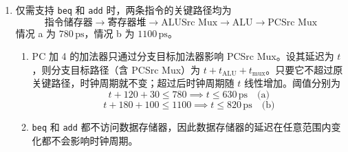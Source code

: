 \begin{problem}
\begin{solution}
\begin{enumerate}
            \item[\textbf{6)}] 仅需支持 \texttt{beq} 和 \texttt{add} 时，两条指令的关键路径均为
            $$
            \text{指令储存器} \to \text{寄存器堆} \to \text{ALUSrc Mux} \to \text{ALU} \to \text{PCSrc Mux}
            $$
            情况 a 为 $780\,\mathrm{ps}$，情况 b 为 $1100\,\mathrm{ps}$。
            \begin{enumerate}
                \item[\textbf{a)}] PC 加 4 的加法器只通过分支目标加法器影响 PCSrc Mux。设其延迟为 $t$，则分支目标路径（含 PCSrc Mux）为 $t + t_{\text{ALU}} + t_{\text{mux}}$。只要它不超过原关键路径，时钟周期就不变；超过后时钟周期随 $t$ 线性增加。阈值分别为
                $$
                t + 120 + 30 \le 780 \implies t \le 630\,\mathrm{ps}\quad\text{(a)}
                $$
                $$
                t + 180 + 100 \le 1100 \implies t \le 820\,\mathrm{ps}\quad\text{(b)}
                $$
                \item[\textbf{b)}] \texttt{beq} 和 \texttt{add} 都不访问数据存储器，因此数据存储器的延迟在任意范围内变化都不会影响时钟周期。
            \end{enumerate}
        \end{enumerate}
    \end{solution}
\end{problem}

